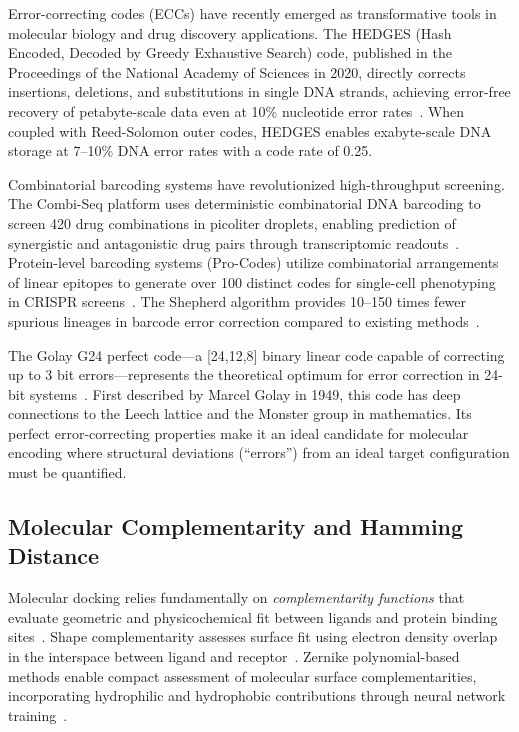 \documentclass[12pt,a4paper]{article}
\begin{document}
Error-correcting codes (ECCs) have recently emerged as transformative tools in molecular biology and drug discovery applications. The HEDGES (Hash Encoded, Decoded by Greedy Exhaustive Search) code, published in the Proceedings of the National Academy of Sciences in 2020, directly corrects insertions, deletions, and substitutions in single DNA strands, achieving error-free recovery of petabyte-scale data even at 10\% nucleotide error rates~\cite{Goldman2020HEDGES}. When coupled with Reed-Solomon outer codes, HEDGES enables exabyte-scale DNA storage at 7--10\% DNA error rates with a code rate of 0.25.

Combinatorial barcoding systems have revolutionized high-throughput screening. The Combi-Seq platform uses deterministic combinatorial DNA barcoding to screen 420 drug combinations in picoliter droplets, enabling prediction of synergistic and antagonistic drug pairs through transcriptomic readouts~\cite{CombiSeq2022}. Protein-level barcoding systems (Pro-Codes) utilize combinatorial arrangements of linear epitopes to generate over 100 distinct codes for single-cell phenotyping in CRISPR screens~\cite{BestPracticesBarcodes2023}. The Shepherd algorithm provides 10--150 times fewer spurious lineages in barcode error correction compared to existing methods~\cite{Shepherd2022}.

The Golay G24 perfect code---a [24,12,8] binary linear code capable of correcting up to 3 bit errors---represents the theoretical optimum for error correction in 24-bit systems~\cite{Golay1949,MacWilliams1977}. First described by Marcel Golay in 1949, this code has deep connections to the Leech lattice and the Monster group in mathematics. Its perfect error-correcting properties make it an ideal candidate for molecular encoding where structural deviations (``errors'') from an ideal target configuration must be quantified.

\subsection{Molecular Complementarity and Hamming Distance}

Molecular docking relies fundamentally on \textit{complementarity functions} that evaluate geometric and physicochemical fit between ligands and protein binding sites~\cite{Bagheri2021Complementarity,Leung2022Docking}. Shape complementarity assesses surface fit using electron density overlap in the interspace between ligand and receptor~\cite{Bagheri2021Complementarity}. Zernike polynomial-based methods enable compact assessment of molecular surface complementarities, incorporating hydrophilic and hydrophobic contributions through neural network training~\cite{Zhu2025Zernike}.
\end{document}
